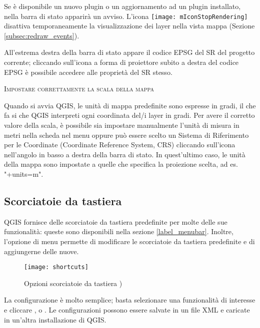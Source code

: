 Se è disponibile un nuovo plugin o un aggiornamento ad un plugin installato,
nella barra di stato apparirà un avviso. 
L'icona \texttt{[image: mIconStopRendering]} disattiva temporaneamente 
la visualizzazione dei layer nella vista mappa (Sezione \ref{subsec:redraw_events}). 

All'estrema destra della barra di stato appare il codice EPSG del SR del progetto corrente; cliccando sull'icona a forma di proiettore subito a destra del codice EPSG è possibile accedere alle proprietà del SR stesso. 

\begin{Tip}\caption{\textsc{Impostare correttamente la scala della mappa}}
Quando si avvia QGIS, le unità di mappa predefinite sono espresse in gradi, il che fa si
che QGIS interpreti ogni coordinata del/i layer in gradi. Per avere il corretto
valore della scala, è possibile sia impostare manualmente l'unità di misura in
metri nella scheda  nel menu  \arrow {} oppure può essere scelto un Sistema di Riferimento per le Coordinate (Coordinate Reference System, CRS) cliccando
sull'icona  nell'angolo in basso a destra della barra di stato. In quest'ultimo caso, le unità della mappa sono impostate a quelle che specifica la proiezione scelta, ad es. "+units=m".
\end{Tip}

\subsection{Scorciatoie da tastiera}\label{shortcuts}

QGIS fornisce delle scorciatoie da tastiera predefinite per molte delle sue funzionalità: queste sono disponibili nella sezione \ref{label_menubar}. Inoltre, l'opzione di menu  \arrow {} permette di modificare le scorciatoie da tastiera predefinite e di aggiungerne delle nuove.

\begin{figure}[ht]
   \centering
   \texttt{[image: shortcuts]}
   \caption{Opzioni scorciatoie da tastiera \nixcaption)} \label{fig:shortcuts}
\end{figure}

La configurazione è molto semplice; basta selezionare una funzionalità di interesse e cliccare ,  o . Le configurazioni possono essere salvate in un file XML e caricate in un'altra installazione di QGIS.

